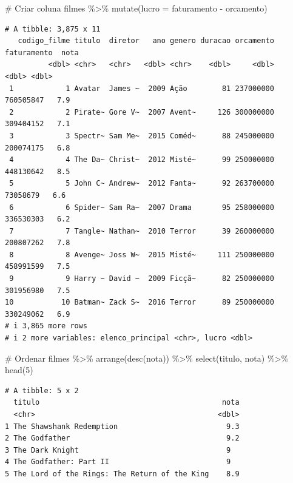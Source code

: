 \documentclass[
  letterpaper,
]{scrbook}
\newenvironment{Shaded}{\begin{snugshade}}{\end{snugshade}}
\newcommand{\AttributeTok}[1]{\textcolor[rgb]{0.40,0.45,0.13}{#1}}
\newcommand{\CommentTok}[1]{\textcolor[rgb]{0.37,0.37,0.37}{#1}}
\newcommand{\DecValTok}[1]{\textcolor[rgb]{0.68,0.00,0.00}{#1}}
\newcommand{\FunctionTok}[1]{\textcolor[rgb]{0.28,0.35,0.67}{#1}}
\newcommand{\NormalTok}[1]{\textcolor[rgb]{0.00,0.23,0.31}{#1}}
\newcommand{\SpecialCharTok}[1]{\textcolor[rgb]{0.37,0.37,0.37}{#1}}
\begin{document}
\begin{Shaded}
\begin{Highlighting}[]
\CommentTok{\# Criar coluna}
\NormalTok{filmes }\SpecialCharTok{\%\textgreater{}\%} \FunctionTok{mutate}\NormalTok{(}\AttributeTok{lucro =}\NormalTok{ faturamento }\SpecialCharTok{{-}}\NormalTok{ orcamento)}
\end{Highlighting}
\end{Shaded}

\begin{verbatim}
# A tibble: 3,875 x 11
   codigo_filme titulo  diretor   ano genero duracao orcamento faturamento  nota
          <dbl> <chr>   <chr>   <dbl> <chr>    <dbl>     <dbl>       <dbl> <dbl>
 1            1 Avatar  James ~  2009 Ação        81 237000000   760505847   7.9
 2            2 Pirate~ Gore V~  2007 Avent~     126 300000000   309404152   7.1
 3            3 Spectr~ Sam Me~  2015 Coméd~      88 245000000   200074175   6.8
 4            4 The Da~ Christ~  2012 Misté~      99 250000000   448130642   8.5
 5            5 John C~ Andrew~  2012 Fanta~      92 263700000    73058679   6.6
 6            6 Spider~ Sam Ra~  2007 Drama       95 258000000   336530303   6.2
 7            7 Tangle~ Nathan~  2010 Terror      39 260000000   200807262   7.8
 8            8 Avenge~ Joss W~  2015 Misté~     111 250000000   458991599   7.5
 9            9 Harry ~ David ~  2009 Ficçã~      82 250000000   301956980   7.5
10           10 Batman~ Zack S~  2016 Terror      89 250000000   330249062   6.9
# i 3,865 more rows
# i 2 more variables: elenco_principal <chr>, lucro <dbl>
\end{verbatim}

\begin{Shaded}
\begin{Highlighting}[]
\CommentTok{\# Ordenar}
\NormalTok{filmes }\SpecialCharTok{\%\textgreater{}\%} \FunctionTok{arrange}\NormalTok{(}\FunctionTok{desc}\NormalTok{(nota)) }\SpecialCharTok{\%\textgreater{}\%} \FunctionTok{select}\NormalTok{(titulo, nota) }\SpecialCharTok{\%\textgreater{}\%} \FunctionTok{head}\NormalTok{(}\DecValTok{5}\NormalTok{)}
\end{Highlighting}
\end{Shaded}

\begin{verbatim}
# A tibble: 5 x 2
  titulo                                          nota
  <chr>                                          <dbl>
1 The Shawshank Redemption                         9.3
2 The Godfather                                    9.2
3 The Dark Knight                                  9  
4 The Godfather: Part II                           9  
5 The Lord of the Rings: The Return of the King    8.9
\end{verbatim}
\end{document}
